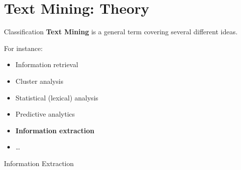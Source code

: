 \documentclass[xcolor=x11names, aspectratio=169]{beamer}
\begin{document}
{ %
    \begin{frame}[plain]
     \end{frame}
}

\section{Text Mining: Theory}%

\begin{frame}{Classification}
\textbf{Text Mining} is a \alert{general term} covering several different ideas.\pause

For instance:
\begin{itemize}[<+->]
\item Information retrieval
\item Cluster analysis
\item Statistical (lexical) analysis
\item Predictive analytics
\item \textbf{Information extraction}
\item\dots
\end{itemize}
\end{frame}

\begin{frame}{Information Extraction}


\end{frame}

\maketitle
\end{document}
